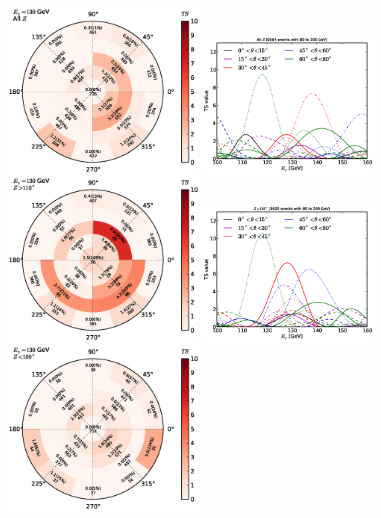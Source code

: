 \documentclass[aps,twocolumn,prd,superscriptaddress,showpacs,nofootinbib,fixfloat]{revtex4}
\begin{document}
\begin{figure}[p]
  \centering
  \includegraphics[width=0.45\textwidth]{plots/polar_all.eps}
  \includegraphics[width=0.40\textwidth]{plots/scan_all.eps}
  \includegraphics[width=0.45\textwidth]{plots/polar_z.GT.110.eps}
  \includegraphics[width=0.40\textwidth]{plots/scan_z.GT.110.eps}
  \includegraphics[width=0.45\textwidth]{plots/polar_z.LE.100.eps}

\end{figure}
\end{document}
